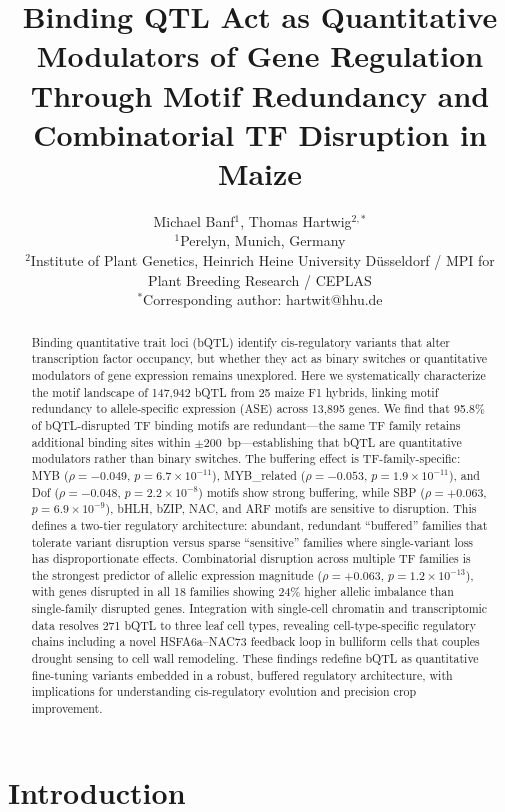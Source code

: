 \documentclass[11pt,a4paper]{article}
\title{Binding QTL Act as Quantitative Modulators of Gene Regulation\\Through Motif Redundancy and Combinatorial TF Disruption in Maize}
\author{Michael Banf$^{1}$, Thomas Hartwig$^{2,*}$\\[6pt]
\small $^1$Perelyn, Munich, Germany\\
\small $^2$Institute of Plant Genetics, Heinrich Heine University D\"usseldorf / MPI for Plant Breeding Research / CEPLAS\\
\small $^*$Corresponding author: hartwit@hhu.de}
\date{}
\begin{document}
\maketitle

\begin{abstract}
Binding quantitative trait loci (bQTL) identify cis-regulatory variants that alter transcription factor occupancy, but whether they act as binary switches or quantitative modulators of gene expression remains unexplored. Here we systematically characterize the motif landscape of 147,942 bQTL from 25 maize F1 hybrids, linking motif redundancy to allele-specific expression (ASE) across 13,895 genes. We find that 95.8\% of bQTL-disrupted TF binding motifs are redundant---the same TF family retains additional binding sites within $\pm$200~bp---establishing that bQTL are quantitative modulators rather than binary switches. The buffering effect is TF-family-specific: MYB ($\rho = -0.049$, $p = 6.7 \times 10^{-11}$), MYB\_related ($\rho = -0.053$, $p = 1.9 \times 10^{-11}$), and Dof ($\rho = -0.048$, $p = 2.2 \times 10^{-8}$) motifs show strong buffering, while SBP ($\rho = +0.063$, $p = 6.9 \times 10^{-9}$), bHLH, bZIP, NAC, and ARF motifs are sensitive to disruption. This defines a two-tier regulatory architecture: abundant, redundant ``buffered'' families that tolerate variant disruption versus sparse ``sensitive'' families where single-variant loss has disproportionate effects. Combinatorial disruption across multiple TF families is the strongest predictor of allelic expression magnitude ($\rho = +0.063$, $p = 1.2 \times 10^{-13}$), with genes disrupted in all 18 families showing 24\% higher allelic imbalance than single-family disrupted genes. Integration with single-cell chromatin and transcriptomic data resolves 271 bQTL to three leaf cell types, revealing cell-type-specific regulatory chains including a novel HSFA6a--NAC73 feedback loop in bulliform cells that couples drought sensing to cell wall remodeling. These findings redefine bQTL as quantitative fine-tuning variants embedded in a robust, buffered regulatory architecture, with implications for understanding cis-regulatory evolution and precision crop improvement.
\end{abstract}

\section{Introduction}
\end{document}
